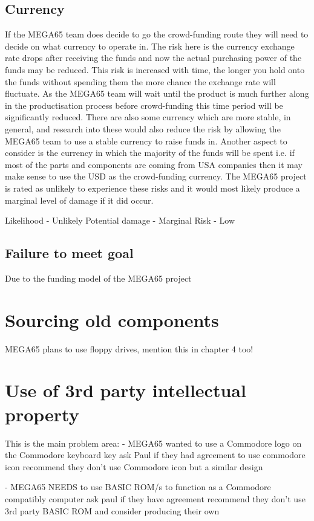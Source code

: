 \subsection{Currency}
If the MEGA65 team does decide to go the crowd-funding route they will need to decide on what currency to operate in. The risk here is the currency exchange rate drops after receiving the funds and now the actual purchasing power of the funds may be reduced. This risk is increased with time, the longer you hold onto the funds without spending them the more chance the exchange rate will fluctuate. As the MEGA65 team will wait until the product is much further along in the productisation process before crowd-funding this time period will be significantly reduced. There are also some currency which are more stable, in general, and research into these would also reduce the risk by allowing the MEGA65 team to use a stable currency to raise funds in. Another aspect to consider is the currency in which the majority of the funds will be spent i.e. if most of the parts and components are coming from USA companies then it may make sense to use the USD as the crowd-funding currency. The MEGA65 project is rated as unlikely to experience these risks and it would most likely produce a marginal level of damage if it did occur.

Likelihood - Unlikely
Potential damage - Marginal
Risk - Low


\subsection{Failure to meet goal}
Due to the funding model of the MEGA65 project


\section{Sourcing old components}
MEGA65 plans to use floppy drives, mention this in chapter 4 too!


\section{Use of 3rd party intellectual property}
This is the main problem area:
- MEGA65 wanted to use a Commodore logo on the Commodore keyboard key
ask Paul if they had agreement to use commodore icon
recommend they don't use Commodore icon but a similar design

- MEGA65 NEEDS to use BASIC ROM/s to function as a Commodore compatibly computer
ask paul if they have agreement
recommend they don't use 3rd party BASIC ROM and consider producing their own

